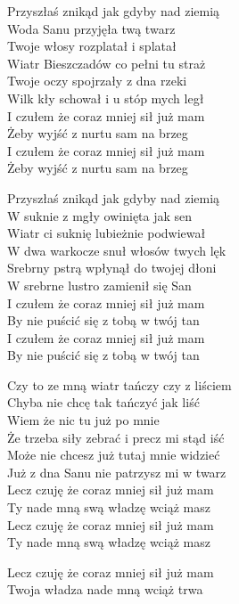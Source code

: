 \begin{text}
    Przyszłaś znikąd jak gdyby nad ziemią\\
    Woda Sanu przyjęła twą twarz\\
    Twoje włosy rozplatał i splatał\\
    Wiatr Bieszczadów co pełni tu straż\\
    Twoje oczy spojrzały z dna rzeki\\
    Wilk kły schował i u stóp mych legł\\
    I czułem że coraz mniej sił już mam\\
    Żeby wyjść z nurtu sam na brzeg\\
    I czułem że coraz mniej sił już mam\\
    Żeby wyjść z nurtu sam na brzeg

    Przyszłaś znikąd jak gdyby nad ziemią\\
    W suknie z mgły owinięta jak sen\\
    Wiatr ci suknię lubieżnie podwiewał\\
    W dwa warkocze snuł włosów twych lęk\\
    Srebrny pstrą wpłynął do twojej dłoni\\
    W srebrne lustro zamienił się San\\
    I czułem że coraz mniej sił już mam\\
    By nie puścić się z tobą w twój tan\\
    I czułem że coraz mniej sił już mam\\
    By nie puścić się z tobą w twój tan

    Czy to ze mną wiatr tańczy czy z liściem\\
    Chyba nie chcę tak tańczyć jak liść\\
    Wiem że nic tu już po mnie\\
    Że trzeba siły zebrać i precz mi stąd iść\\
    Może nie chcesz już tutaj mnie widzieć\\
    Już z dna Sanu nie patrzysz mi w twarz\\
    Lecz czuję że coraz mniej sił już mam\\
    Ty nade mną swą władzę wciąż masz\\
    Lecz czuję że coraz mniej sił już mam\\
    Ty nade mną swą władzę wciąż masz

    Lecz czuję że coraz mniej sił już mam\\
    Twoja władza nade mną wciąż trwa
\end{text}
\begin{chord}

\end{chord}